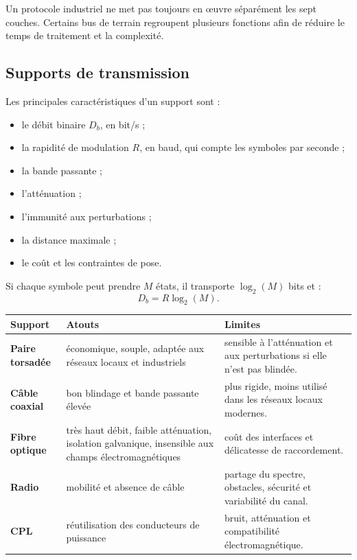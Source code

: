 Un protocole industriel ne met pas toujours en œuvre séparément les sept couches. Certains bus de terrain regroupent plusieurs fonctions afin de réduire le temps de traitement et la complexité.

\subsection{Supports de transmission}

Les principales caractéristiques d'un support sont :
\begin{itemize}
  \item le débit binaire $D_b$, en bit/s ;
  \item la rapidité de modulation $R$, en baud, qui compte les symboles par seconde ;
  \item la bande passante ;
  \item l'atténuation ;
  \item l'immunité aux perturbations ;
  \item la distance maximale ;
  \item le coût et les contraintes de pose.
\end{itemize}

Si chaque symbole peut prendre $M$ états, il transporte $\log_2(M)$ bits et :
\[
\boxed{D_b=R\log_2(M).}
\]

\begin{center}
\small
\begin{tabularx}{\linewidth}{>{\bfseries}p{2.8cm}X X}
\toprule
Support & Atouts & Limites \\
\midrule
Paire torsadée & économique, souple, adaptée aux réseaux locaux et industriels & sensible à l'atténuation et aux perturbations si elle n'est pas blindée.\\
Câble coaxial & bon blindage et bande passante élevée & plus rigide, moins utilisé dans les réseaux locaux modernes.\\
Fibre optique & très haut débit, faible atténuation, isolation galvanique, insensible aux champs électromagnétiques & coût des interfaces et délicatesse de raccordement.\\
Radio & mobilité et absence de câble & partage du spectre, obstacles, sécurité et variabilité du canal.\\
CPL & réutilisation des conducteurs de puissance & bruit, atténuation et compatibilité électromagnétique.\\
\bottomrule
\end{tabularx}
\end{center}

